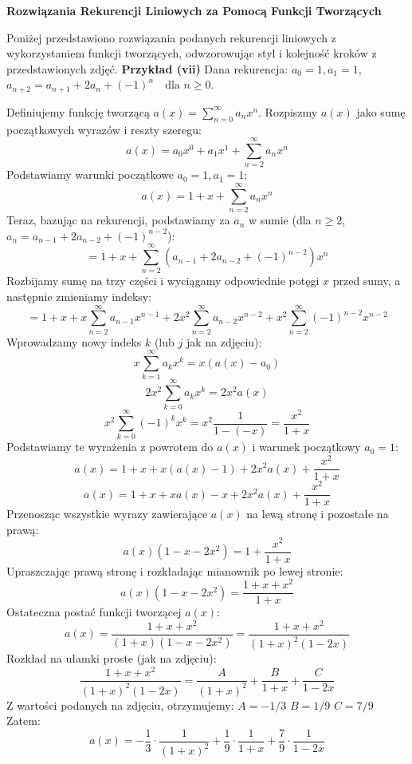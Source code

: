 \documentclass{mwart}
\begin{document}
\begin{mdframed}
    \textbf{Rozwiązania Rekurencji Liniowych za Pomocą Funkcji Tworzących}

    Poniżej przedstawiono rozwiązania podanych rekurencji liniowych z wykorzystaniem funkcji tworzących, odwzorowując styl i kolejność kroków z przedstawionych zdjęć. \newline\newline
    \textbf{Przykład (vii)} \newline
    Dana rekurencja:
    $a_0 = 1, a_1 = 1,$
    $a_{n+2} = a_{n+1} + 2a_n + (-1)^n \quad \text{dla } n \ge 0.$

    Definiujemy funkcję tworzącą $a(x) = \sum_{n=0}^{\infty} a_n x^n$.
    Rozpiszmy $a(x)$ jako sumę początkowych wyrazów i reszty szeregu:
    $$ a(x) = a_0 x^0 + a_1 x^1 + \sum_{n=2}^{\infty} a_n x^n $$
    Podstawiamy warunki początkowe $a_0 = 1, a_1 = 1$:
    $$ a(x) = 1 + x + \sum_{n=2}^{\infty} a_n x^n $$
    Teraz, bazując na rekurencji, podstawiamy za $a_n$ w sumie (dla $n \ge 2$, $a_n = a_{n-1} + 2a_{n-2} + (-1)^{n-2}$):
    $$ = 1 + x + \sum_{n=2}^{\infty} (a_{n-1} + 2a_{n-2} + (-1)^{n-2}) x^n $$
    Rozbijamy sumę na trzy części i wyciągamy odpowiednie potęgi $x$ przed sumy, a następnie zmieniamy indeksy:
    $$ = 1 + x + x \sum_{n=2}^{\infty} a_{n-1} x^{n-1} + 2x^2 \sum_{n=2}^{\infty} a_{n-2} x^{n-2} + x^2 \sum_{n=2}^{\infty} (-1)^{n-2} x^{n-2} $$
    Wprowadzamy nowy indeks $k$ (lub $j$ jak na zdjęciu):
    $$ x \sum_{k=1}^{\infty} a_k x^k = x(a(x) - a_0) $$
    $$ 2x^2 \sum_{k=0}^{\infty} a_k x^k = 2x^2 a(x) $$
    $$ x^2 \sum_{k=0}^{\infty} (-1)^k x^k = x^2 \frac{1}{1-(-x)} = \frac{x^2}{1+x} $$
    Podstawiamy te wyrażenia z powrotem do $a(x)$ i warunek początkowy $a_0=1$:
    $$ a(x) = 1 + x + x(a(x) - 1) + 2x^2 a(x) + \frac{x^2}{1+x} $$
    $$ a(x) = 1 + x + x a(x) - x + 2x^2 a(x) + \frac{x^2}{1+x} $$
    Przenosząc wszystkie wyrazy zawierające $a(x)$ na lewą stronę i pozostałe na prawą:
    $$ a(x) (1 - x - 2x^2) = 1 + \frac{x^2}{1+x} $$
    Upraszczając prawą stronę i rozkładając mianownik po lewej stronie:
    $$ a(x) (1 - x - 2x^2) = \frac{1+x+x^2}{1+x} $$
    Ostateczna postać funkcji tworzącej $a(x)$:
    $$ a(x) = \frac{1+x+x^2}{(1+x)(1 - x - 2x^2)} = \frac{1+x+x^2}{(1+x)^2 (1-2x)} $$
    Rozkład na ułamki proste (jak na zdjęciu):
    $$ \frac{1+x+x^2}{(1+x)^2 (1-2x)} = \frac{A}{(1+x)^2} + \frac{B}{1+x} + \frac{C}{1-2x} $$
    Z wartości podanych na zdjęciu, otrzymujemy:
    $A = -1/3$
    $B = 1/9$
    $C = 7/9$
    Zatem:
    $$ a(x) = -\frac{1}{3} \cdot \frac{1}{(1+x)^2} + \frac{1}{9} \cdot \frac{1}{1+x} + \frac{7}{9} \cdot \frac{1}{1-2x} $$

\end{mdframed}
\end{document}
